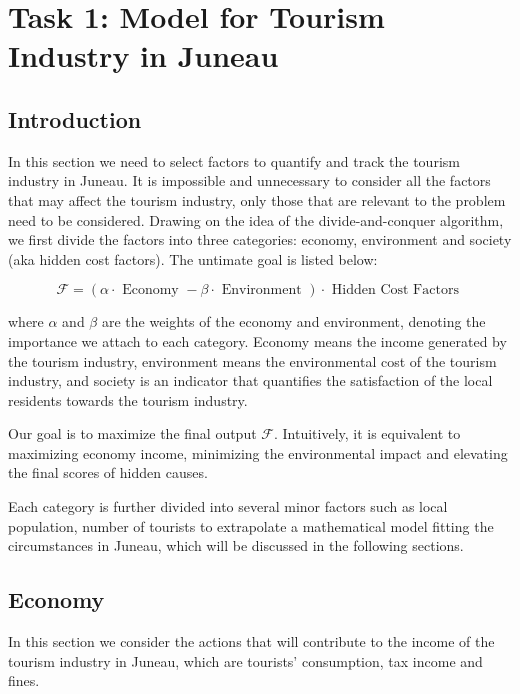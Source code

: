 \section{Task 1: Model for Tourism Industry in Juneau}

\subsection{Introduction}


In this section we need to select factors to quantify and track the tourism industry in Juneau. 
It is impossible and unnecessary to consider all the factors that may affect the 
tourism industry, only those that are relevant to the problem need to be considered.
Drawing on the idea of the divide-and-conquer algorithm, we first divide the factors 
into three categories: economy, environment and society (aka hidden cost factors). 
The untimate goal is listed below:


\begin{equation}
    \mathcal{F}=(\alpha \cdot \text { Economy }-\beta \cdot \text { Environment }) \cdot \text { Hidden Cost Factors }
\end{equation}

where $\alpha$ and $\beta$ are the weights of the economy and environment, denoting the importance we attach to each category.
Economy means the income generated by the tourism industry, environment means the environmental cost of the tourism industry, and 
society is an indicator that quantifies the satisfaction of the local residents towards the tourism industry.

Our goal is to maximize the final output $\mathcal{F}$. Intuitively, it 
is equivalent to maximizing economy income, minimizing the environmental 
impact and elevating the final scores of hidden causes.

Each category is further divided into several minor factors such as local population, 
number of tourists to extrapolate a mathematical model fitting the circumstances in Juneau,
which will be discussed in the following sections.





\subsection{Economy}

In this section we consider the actions that will contribute to the income of the tourism industry in Juneau, which are
tourists' consumption, tax income and fines.

